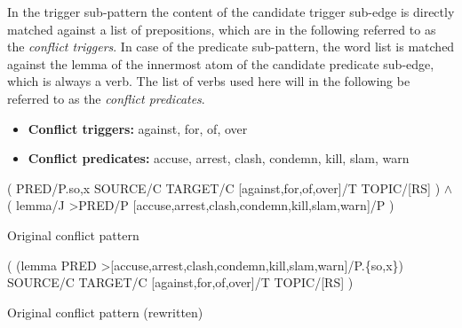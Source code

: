 \documentclass[11pt]{scrreprt}
\begin{document}
{In the trigger sub-pattern the content of the candidate trigger sub-edge is directly matched against a list of prepositions, which are in the following referred to as the \textit{conflict triggers}. In case of the predicate sub-pattern, the word list is matched against the lemma of the innermost atom of the candidate predicate sub-edge, which is always a verb. The list of verbs used here will in the following be referred to as the \textit{conflict predicates}.

\begin{itemize}
	\item \textbf{\textsf{Conflict triggers:}} against, for, of, over
	\item \textbf{\textsf{Conflict predicates:}} accuse, arrest, clash, condemn, kill, slam, warn
\end{itemize}


\begin{pattern}
  \normalfont\sffamily
  \centering
  ( PRED/P.{so,x} SOURCE/C TARGET/C [against,for,of,over]/T TOPIC/[RS] ) \(\wedge\) \\
  ( lemma/J >PRED/P [accuse,arrest,clash,condemn,kill,slam,warn]/P )
  \caption{Original conflict pattern}
  \label{pat:original-conflict-realog}
\end{pattern}

\begin{pattern}
  \normalfont\sffamily
  \centering
  ( (lemma PRED >[accuse,arrest,clash,condemn,kill,slam,warn]/P.\{so,x\}) \\
  SOURCE/C TARGET/C [against,for,of,over]/T TOPIC/[RS] ) 

  \caption{Original conflict pattern (rewritten)}
  \label{pat:original-conflict}
\end{pattern}








}
\end{document}
